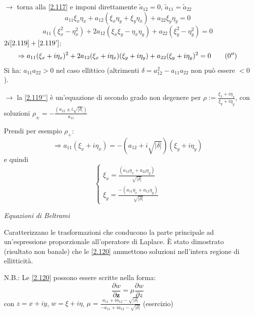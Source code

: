 \documentclass[a4paper,11pt]{report}
\newcommand{\z}{\boldsymbol{z}}
\begin{document}
$\rightarrow$ torna alla \eqref{2.117} e imponi direttamente $\tilde{a}_{12}=0$, $\tilde{a}_{11}=\tilde{a}_{22}$
\begin{equation}
a_{11}\xi_x \eta_x + a_{12}(\xi_x\eta_y + \xi_y\eta_x) + a_{22}\xi_y\eta_y=0
\label{2.119}
\end{equation}
\begin{equation}
a_{11}(\xi_x^2 - \eta_x^2) + 2a_{12}(\xi_x\xi_y - \eta_x\eta_y) + a_{22}(\xi_y^2 - \eta_y^2)=0
\label{2.119'}
\tag{$\theequation^\prime$}
\end{equation}
$2i\eqref{2.119} + \eqref{2.119'}$:
\begin{equation}
\Rightarrow a_{11}(\xi_x + i\eta_x)^2 + 2a_{12}(\xi_x + i\eta_x)(\xi_y + i\eta_y) + a_{22}(\xi_y + i\eta_y)^2 =0
\label{2.119''}
\tag{$\theequation^{\prime\prime}$}
\end{equation}
Si ha: $a_{11}a_{22}>0$ nel caso ellittico (altrimenti $\delta =a_{12}^2 - a_{11}a_{22}$ non pu\`o essere $<0$). 

$\rightarrow$ la \eqref{2.119''} \`e un'equazione di secondo grado non degenere per $\rho:= \frac{\xi_x + i\eta_x}{\xi_y + i\eta_y}$, con soluzioni $\rho_{\pm}=-\frac{\left(a_{12} \pm i\sqrt{|\delta|} \right)} { a_{11}}$

Prendi per esempio $\rho_+$:
\[
\Rightarrow a_{11} (\xi_x + i\eta_x)=-(a_{12}+i\sqrt{|\delta|})(\xi_y + i \eta_y)
\]
e quindi 
\begin{equation}
\begin{cases}
\xi_x=\frac{(a_{12}\eta_x + a_{22}\eta_y)}{\sqrt{|\delta|}} \\
\xi_y=\frac{-(a_{11}\eta_x + a_{12}\eta_y)}{\sqrt{|\delta|}}
\end{cases}
\label{2.120}
\end{equation}
\centerline{\emph{Equazioni di Beltrami}} 

Caratterizzano le trasformazioni che conducono la parte principale ad un'espressione proporzionale all'operatore di Laplace. \`E stato dimostrato (risultato non banale) che le \eqref{2.120} ammettono soluzioni nell'intera regione di ellitticit\`a.

N.B.: Le \eqref{2.120} possono essere scritte nella forma:
\begin{equation}
\frac{\partial w}{\partial \z}=\mu\frac{\partial w}{\partial z}
\label{2.120'}
\tag{$\theequation^\prime$}
\end{equation}
con $z=x+iy$, $w=\xi+i\eta$, $\mu=\frac{a_{11}+i a_{12} - \sqrt{|\delta|}}{-a_{11}+i a_{12} - \sqrt{|\delta|}}$ (esercizio)
\end{document}
